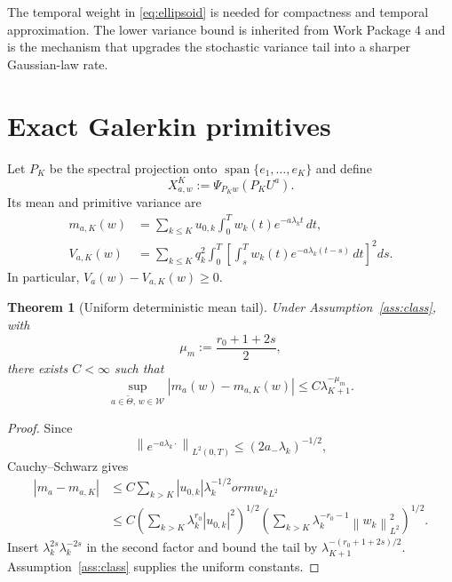 \documentclass[11pt]{article}
\newtheorem{theorem}[assumption]{Theorem}
\theoremstyle{remark}
\newcommand{\cW}{\mathcal W}
\newcommand{\norm}[1]{\left\lVert #1\right\rVert}
\begin{document}
The temporal weight in \eqref{eq:ellipsoid} is needed for compactness and temporal approximation. The lower variance bound is inherited from Work Package 4 and is the mechanism that upgrades the stochastic variance tail into a sharper Gaussian-law rate.

\section{Exact Galerkin primitives}

Let $P_K$ be the spectral projection onto $\operatorname{span}\{e_1,\dots,e_K\}$ and define
\begin{equation}\label{eq:XK}
 X_{a,w}^{K}:=\Psi_{P_Kw}(P_KU^a).
\end{equation}
Its mean and primitive variance are
\begin{align}
 m_{a,K}(w)
 &=\sum_{k\le K}u_{0,k}\int_0^T w_k(t)e^{-a\lambda_kt}\,dt,
 \label{eq:mK}\\
 V_{a,K}(w)
 &=\sum_{k\le K}q_k^2\int_0^T
 \left[
 \int_s^T w_k(t)e^{-a\lambda_k(t-s)}\,dt
 \right]^2ds.
 \label{eq:VK}
\end{align}
In particular, $V_a(w)-V_{a,K}(w)\ge0$.

\begin{theorem}[Uniform deterministic mean tail]\label{thm:mean-tail}
Under Assumption~\ref{ass:class}, with
\begin{equation}\label{eq:mum}
 \mu_m:=\frac{r_0+1+2s}{2},
\end{equation}
there exists $C<\infty$ such that
\begin{equation}\label{eq:mean-tail}
 \sup_{a\in\widetilde\Theta,\,w\in\cW}
 |m_a(w)-m_{a,K}(w)|
 \le C\lambda_{K+1}^{-\mu_m}.
\end{equation}
\end{theorem}

\begin{proof}
Since
\[
 \norm{e^{-a\lambda_k\cdot}}_{L^2(0,T)}
 \le(2a_-\lambda_k)^{-1/2},
\]
Cauchy--Schwarz gives
\begin{align*}
 |m_a-m_{a,K}|
 &\le C\sum_{k>K}|u_{0,k}|\lambda_k^{-1/2}
orm{w_k}_{L^2}\\
 &\le C
 \left(\sum_{k>K}\lambda_k^{r_0}|u_{0,k}|^2\right)^{1/2}
 \left(\sum_{k>K}\lambda_k^{-r_0-1}\norm{w_k}_{L^2}^2\right)^{1/2}.
\end{align*}
Insert $\lambda_k^{2s}\lambda_k^{-2s}$ in the second factor and bound the tail by $\lambda_{K+1}^{-(r_0+1+2s)/2}$. Assumption~\ref{ass:class} supplies the uniform constants.
\end{proof}
\end{document}
